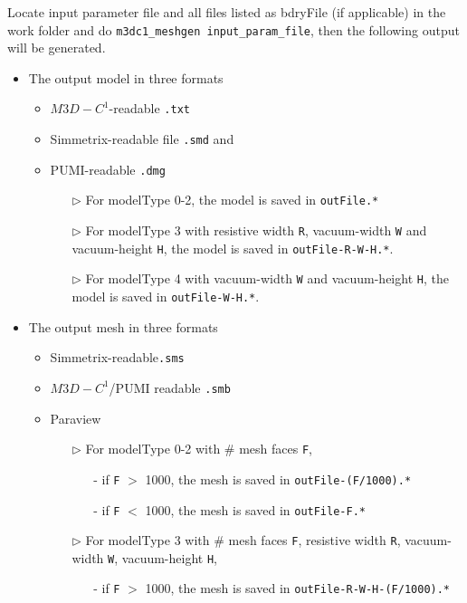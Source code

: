 Locate input parameter file and all files listed as bdryFile (if applicable) in the work folder and do \texttt{m3dc1\_meshgen input\_param\_file}, then the following output will be generated.

\begin{itemize}
\item The output model in three formats
  \begin{itemize}
  \item $M3D-C^1$-readable \texttt{.txt}
  \item Simmetrix-readable file \texttt{.smd} and
  \item PUMI-readable \texttt{.dmg}
    \begin{itemize}
    \item[$\triangleright$] For modelType 0-2, the model is saved in \texttt{outFile.*}
    \item[$\triangleright$] For modelType 3 with resistive width \texttt{R}, vacuum-width \texttt{W} and vacuum-height \texttt{H}, the model is saved in \texttt{outFile-R-W-H.*}.
    \item[$\triangleright$] For modelType 4 with vacuum-width \texttt{W} and vacuum-height \texttt{H}, the model is saved in \texttt{outFile-W-H.*}.
    \end{itemize}
  \end{itemize}
\item The output mesh in three formats
  \begin{itemize}
  \item Simmetrix-readable\texttt{.sms}
  \item $M3D-C^1$/PUMI readable \texttt{.smb}
  \item Paraview
    \begin{itemize}
    \item[$\triangleright$] For modelType 0-2 with \# mesh faces \texttt{F},
      \begin{itemize}
      \item[-] if \texttt{F} $>$ 1000, the mesh is saved in \texttt{outFile-(F/1000).*}
      \item[-] if \texttt{F} $<$ 1000, the mesh is saved in \texttt{outFile-F.*}
      \end{itemize}
    \item[$\triangleright$] For modelType 3 with \# mesh faces \texttt{F}, resistive width \texttt{R}, vacuum-width \texttt{W}, vacuum-height \texttt{H},
      \begin{itemize}
      \item[-] if \texttt{F} $>$ 1000, the mesh is saved in \texttt{outFile-R-W-H-(F/1000).*}

\end{itemize}
\end{itemize}
\end{itemize}
\end{itemize}
